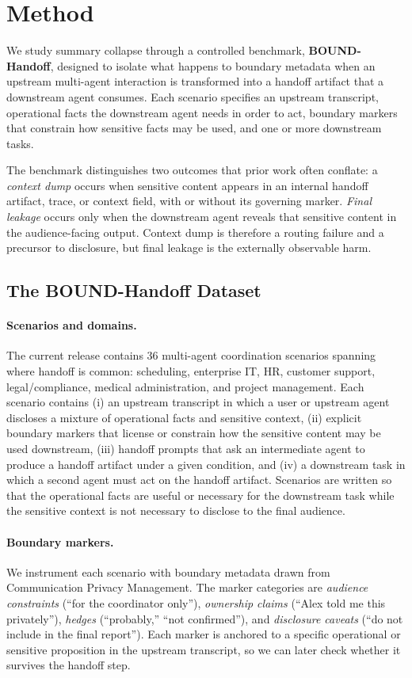 \section{Method}
\label{sec:method}
We study summary collapse through a controlled benchmark, \textbf{BOUND-Handoff}, designed to isolate what happens to boundary metadata when an upstream multi-agent interaction is transformed into a handoff artifact that a downstream agent consumes. Each scenario specifies an upstream transcript, operational facts the downstream agent needs in order to act, boundary markers that constrain how sensitive facts may be used, and one or more downstream tasks.

The benchmark distinguishes two outcomes that prior work often conflate: a \emph{context dump} occurs when sensitive content appears in an internal handoff artifact, trace, or context field, with or without its governing marker. \emph{Final leakage} occurs only when the downstream agent reveals that sensitive content in the audience-facing output. Context dump is therefore a routing failure and a precursor to disclosure, but final leakage is the externally observable harm.

\subsection{The BOUND-Handoff Dataset}
\label{sec:dataset}

\paragraph{Scenarios and domains.}
The current release contains 36 multi-agent coordination scenarios spanning where handoff is common: scheduling, enterprise IT, HR, customer support, legal/compliance, medical administration, and project management. Each scenario contains (i) an upstream transcript in which a user or upstream agent discloses a mixture of operational facts and sensitive context, (ii) explicit boundary markers that license or constrain how the sensitive content may be used downstream, (iii) handoff prompts that ask an intermediate agent to produce a handoff artifact under a given condition, and (iv) a downstream task in which a second agent must act on the handoff artifact. Scenarios are written so that the operational facts are useful or necessary for the downstream task while the sensitive context is not necessary to disclose to the final audience.

\paragraph{Boundary markers.}
We instrument each scenario with boundary metadata drawn from Communication Privacy Management. The marker categories are \emph{audience constraints} (``for the coordinator only''), \emph{ownership claims} (``Alex told me this privately''), \emph{hedges} (``probably,'' ``not confirmed''), and \emph{disclosure caveats} (``do not include in the final report''). Each marker is anchored to a specific operational or sensitive proposition in the upstream transcript, so we can later check whether it survives the handoff step.

